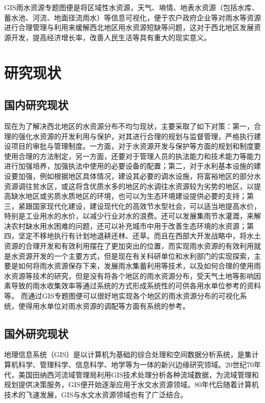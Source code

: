 GIS雨水资源专题图便是将区域性水资源，天气、墒情、地表水资源（包括水库、蓄水池、河流、地面径流雨水）等信息可视化，便于农户政府企业等对雨水等资源进行合理管理与利用来缓解西北地区用水资源短缺等问题，这对于西北地区发展资源开发\cite{刘治华-5}，提高经济增长率，改善人民生活等具有重大的现实意义。


\section{研究现状}
\subsection{国内研究现状}

现在为了解决西北地区的水资源分布不均匀现状，主要采取了如下对策：第一，合理的强化水资源的开发利用与保护，对其进行合理的规划与监督管理，严格执行建设项目的审批与管理制度。一方面，对于水资源开发与保护等方面的规划和制度要使用合理的方法制定，另一方面，还要对于管理人员的执法能力和技术能力等能力进行加强培养，加强执法中使用的必要设备的配置；第二，对于水利基本设施的建设要加强，例如根据地区具体情况，建设其必要的调水设施，将富裕地区的部分水资源调往贫水区，或这将含优质水多的地区的水调往水资源较为劣势的地区，以提高缺水地区或劣质水质地区的环境，也可以为生态环境建设提供必要的支持；第三，紧跟国家现代化建设，建设现代化的高效节水型社会，可以适当地提高水价，特别是工业用水的水价，以减少行业对水的浪费。还可以发展集雨节水灌溉，来解决农村缺水用水困难的问题，还可以补充城市中用于改善生态环境的水资源；第四，坚定不移地执行有计划地退耕还林、还草。而且在西部大开发战略中，将水土资源的合理开发和有效利用摆在了更加突出的位置，而实现雨水资源的有效利用就是水资源开发的一个主要方式，但是现在有关科研单位和水利部门的实现探索，主要是如何将雨水资源保存下来，发展雨水集蓄利用等技术，以及如何合理的使用雨水资源等技术的研究，但是没有将各个地区的雨水资源分布，受天气土地等影响因素导致的雨水收集效率等通过系统的方式形成系统性的可供各用水单位参考的资料等。
而通过GIS专题图便可以很好地实现各个地区的雨水资源分布的可视化系统，使得用水单位对雨水资源的调配等方面有系统的参考。

\subsection{国外研究现状}
地理信息系统（GIS）是以计算机为基础的综合处理和空间数据分析系统，是集计算机科学、管理科学、信息科学、地学等为一体的新兴边缘研究领域\cite{陈鲁周-25}。20世纪70年代，美国田纳西河流域管理局利用GIS技术处理分析各种流域数据，为流域管理和规划提供决策服务，GIS便开始逐渐应用于水文水资源领域。80年代后随着计算机技术的飞速发展，GIS与水文水资源领域也有了广泛结合\cite{刘佳于福亮-24}。

